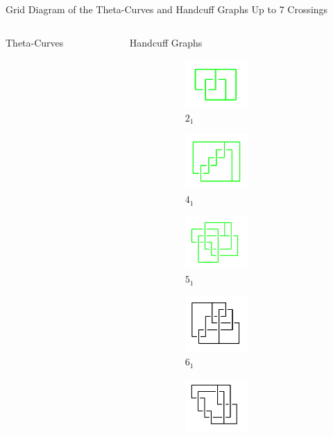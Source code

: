 \documentclass[final]{beamer}
\begin{document}
\begin{frame}[t]
\begin{alertblock}{Grid Diagram of the Theta-Curves and Handcuff Graphs Up to 7 Crossings}
\begin{columns}[t]
\begin{column}{0.6\textwidth}
\begin{alertblock}{Theta-Curves}
  \end{alertblock}
\end{column}
\begin{column}{0.3\textwidth}
  \begin{alertblock}{Handcuff Graphs}
  \begin{figure}
    \begin{subfigure}{0.15\textwidth}
    \includegraphics[width=2.4cm]{../Midterm_Poster/grid_diagram/handcuff_2_1.png}
    \caption{$2_{1}$} 
    \end{subfigure}
    \begin{subfigure}{0.15\textwidth}
    \includegraphics[width=2.4cm]{../Midterm_Poster/grid_diagram/handcuff_4_1.png}
    \caption{$4_{1}$} 
    \end{subfigure}
    \begin{subfigure}{0.15\textwidth}
    \includegraphics[width=2.4cm]{../Midterm_Poster/grid_diagram/handcuff_5_1.png}
    \caption{$5_{1}$} 
    \end{subfigure}
    \begin{subfigure}{0.15\textwidth}
    \includegraphics[width=2.4cm]{../Midterm_Poster/grid_diagram/handcuff_6_1.png}
    \caption{$6_{1}$} 
    \end{subfigure}
    \begin{subfigure}{0.15\textwidth}
    \includegraphics[width=2.4cm]{../Midterm_Poster/grid_diagram/handcuff_6_2.png}

\end{subfigure}
\end{figure}
\end{alertblock}
\end{column}
\end{columns}
\end{alertblock}
\end{frame}
\end{document}
